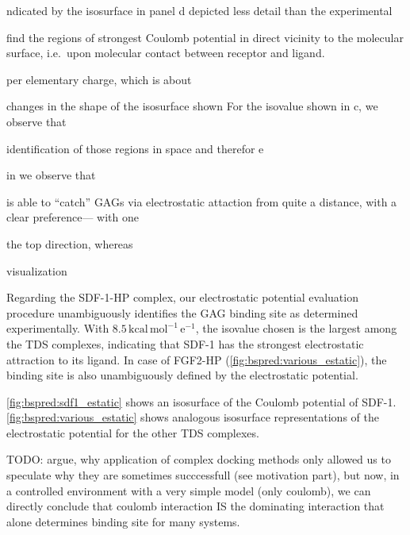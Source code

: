 ndicated
by the isosurface in panel d depicted less detail than the experimental

find the regions of strongest Coulomb potential in direct vicinity to the molecular
surface, i.e.\ upon molecular contact between receptor and ligand.


per elementary charge,
which is about



changes in the shape of the isosurface shown For the isovalue shown in c, we
observe that



identification of those regions in
space and therefor e



in  we observe that

is able to \enquote{catch} GAGs via electrostatic attaction from quite a
distance, with a clear preference--- with one


the top direction, whereas



visualization


Regarding the SDF-1-HP complex, our electrostatic potential evaluation procedure
unambiguously identifies the GAG binding site as determined experimentally. With
$8.5\,\mathrm{kcal\,mol^{-1}\,e^{-1}}$, the isovalue chosen is the largest among
the TDS complexes, indicating that SDF-1 has the strongest electrostatic
attraction to its ligand. In case of FGF2-HP (\cref{fig:bspred:various_estatic}), the
binding site is also unambiguously defined by the electrostatic potential.







\cref{fig:bspred:sdf1_estatic} shows an isosurface of
the Coulomb potential of SDF-1.
\cref{fig:bspred:various_estatic} shows analogous isosurface representations of
the electrostatic potential for the other TDS complexes.










TODO: argue, why application of complex docking methods only allowed us to
speculate why they are sometimes succcessfull (see motivation part), but now,
in a controlled environment with a very simple model (only coulomb), we can
directly conclude that coulomb interaction IS the dominating interaction that
alone determines binding site for many systems.


